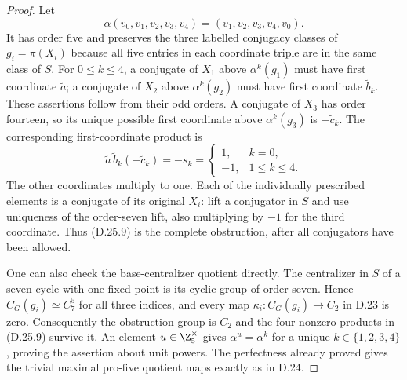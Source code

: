 \begin{proof}
Let
\[
 \alpha(v_0,v_1,v_2,v_3,v_4)=(v_1,v_2,v_3,v_4,v_0).
 \tag{D.25.8}
\]
It has order five and preserves the three labelled conjugacy
classes of $g_i=\pi(X_i)$ because all five entries in each
coordinate triple are in the same class of $S$.
For $0\leq k\leq4$, a conjugate of $X_1$ above
$\alpha^k(g_1)$ must have first coordinate $\widetilde a$;
a conjugate of $X_2$ above $\alpha^k(g_2)$ must have first
coordinate $\widetilde b_k$.  These assertions follow from
their odd orders.  A conjugate of $X_3$ has order fourteen,
so its unique possible first coordinate above
$\alpha^k(g_3)$ is $-\widetilde c_k$.
The corresponding first-coordinate product is
\[
 \widetilde a\,\widetilde b_k(-\widetilde c_k)
       =-s_k
       =\begin{cases}1,&k=0,\\-1,&1\leq k\leq4.
         \end{cases}
 \tag{D.25.9}
\]
The other coordinates multiply to one.  Each of the individually
prescribed elements is a conjugate of its original $X_i$:
lift a conjugator in $S$ and use uniqueness of the order-seven
lift, also multiplying by $-1$ for the third coordinate.
Thus \textup{(D.25.9)} is the complete obstruction, after all
conjugators have been allowed.

One can also check the base-centralizer quotient directly.
The centralizer in $S$ of a seven-cycle with one fixed point
is its cyclic group of order seven.  Hence
$C_G(g_i)\simeq C_7^5$ for all three indices, and every map
$\kappa_i:C_G(g_i)\to C_2$ in D.23 is zero.  Consequently
the obstruction group is $C_2$ and the four nonzero products
in \textup{(D.25.9)} survive it.  An element
$u\in\Z_5^\times$ gives $\alpha^u=\alpha^k$ for a unique
$k\in\{1,2,3,4\}$, proving the assertion about unit powers.
The perfectness already proved gives the trivial maximal
pro-five quotient maps exactly as in D.24.


\end{proof}
